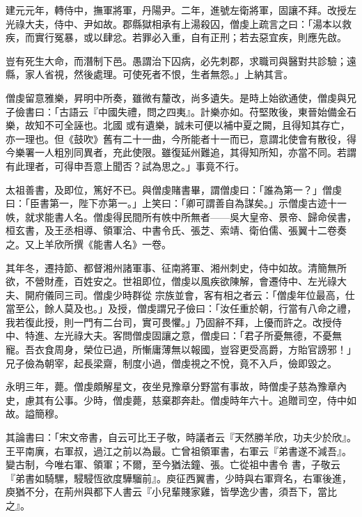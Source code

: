 \begin{pinyinscope}
 建元元年，轉侍中，撫軍將軍，丹陽尹。二年，進號左衛將軍，固讓不拜。改授左光祿大夫，侍中、尹如故。郡縣獄相承有上湯殺囚，僧虔上疏言之曰：「湯本以救疾，而實行冤暴，或以肆忿。若罪必入重，自有正刑；若去惡宜疾，則應先啟。



 豈有死生大命，而潛制下邑。愚謂治下囚病，必先刺郡，求職司與醫對共診驗；遠縣，家人省視，然後處理。可使死者不恨，生者無怨。」上納其言。



 僧虔留意雅樂，昇明中所奏，雖微有釐改，尚多遺失。是時上始欲通使，僧虔與兄子儉書曰：「古語云『中國失禮，問之四夷』。計樂亦如。苻堅敗後，東晉始備金石樂，故知不可全誣也。北國
 或有遺樂，誠未可便以補中夏之闕，且得知其存亡，亦一理也。但《鼓吹》舊有二十一曲，今所能者十一而已，意謂北使會有散役，得今樂署一人粗別同異者，充此使限。雖復延州難追，其得知所知，亦當不同。若謂有此理者，可得申吾意上聞否？試為思之。」事竟不行。



 太祖善書，及即位，篤好不已。與僧虔賭書畢，謂僧虔曰：「誰為第一？」僧虔曰：「臣書第一，陛下亦第一。」上笑曰：「卿可謂善自為謀矣。」示僧虔古迹十一帙，就求能書人名。僧虔得民間所有帙中所無者——吳大皇帝、景帝、歸命侯書，桓玄書，及王丞相導、領軍洽、中書令氏、張芝、索靖、衛伯儒、張翼十二卷奏之。又上羊欣所撰《能書人名》一卷。



 其年冬，遷持節、都督湘州諸軍事、征南將軍、湘州刺史，侍中如故。清簡無所欲，不營財產，百姓安之。世祖即位，僧虔以風疾欲陳解，會遷侍中、左光祿大夫、開府儀同三司。僧虔少時群從
 宗族並會，客有相之者云：「僧虔年位最高，仕當至公，餘人莫及也。」及授，僧虔謂兄子儉曰：「汝任重於朝，行當有八命之禮，我若復此授，則一門有二台司，實可畏懼。」乃固辭不拜，上優而許之。改授侍中、特進、左光祿大夫。客問僧虔固讓之意，僧虔曰：「君子所憂無德，不憂無寵。吾衣食周身，榮位已過，所慚庸薄無以報國，豈容更受高爵，方貽官謗邪！」兄子儉為朝宰，起長梁齋，制度小過，僧虔視之不悅，竟不入戶，儉即毀之。



 永明三年，薨。僧虔頗解星文，夜坐見豫章分野當有事故，時僧虔子慈為豫章內史，慮其有公事。少時，僧虔薨，慈棄郡奔赴。僧虔時年六十。追贈司空，侍中如故。謚簡穆。



 其論書曰：「宋文帝書，自云可比王子敬，時議者云『天然勝羊欣，功夫少於欣』。王平南廙，右軍叔，過江之前以為最。亡曾祖領軍書，右軍云『弟書遂不減吾』。變古制，今唯右軍、領軍；不爾，至今猶法鐘、張。亡從祖中書令
 書，子敬云『弟書如騎騾，駸駸恆欲度驊騮前』。庾征西翼書，少時與右軍齊名，右軍後進，庾猶不分，在荊州與都下人書云『小兒輩賤家雞，皆學逸少書，須吾下，當比之』。




\end{pinyinscope}
